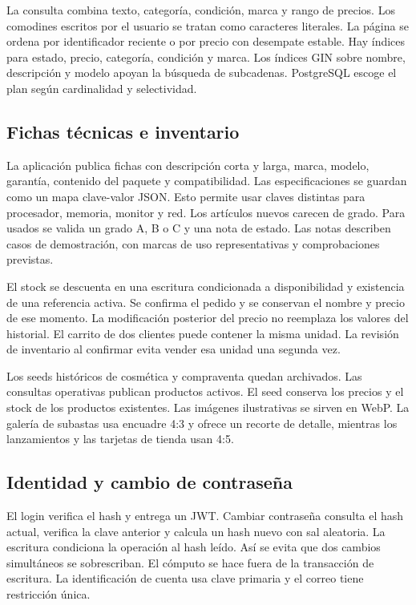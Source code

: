 \documentclass[conference]{IEEEtran}
\begin{document}
La consulta combina texto, categoría, condición, marca y rango de precios. Los comodines escritos por el usuario se tratan como caracteres literales. La página se ordena por identificador reciente o por precio con desempate estable. Hay índices para estado, precio, categoría, condición y marca. Los índices GIN sobre nombre, descripción y modelo apoyan la búsqueda de subcadenas. PostgreSQL escoge el plan según cardinalidad y selectividad.

\subsection{Fichas técnicas e inventario}
La aplicación publica fichas con descripción corta y larga, marca, modelo, garantía, contenido del paquete y compatibilidad. Las especificaciones se guardan como un mapa clave-valor JSON. Esto permite usar claves distintas para procesador, memoria, monitor y red. Los artículos nuevos carecen de grado. Para usados se valida un grado A, B o C y una nota de estado. Las notas describen casos de demostración, con marcas de uso representativas y comprobaciones previstas.

El stock se descuenta en una escritura condicionada a disponibilidad y existencia de una referencia activa. Se confirma el pedido y se conservan el nombre y precio de ese momento. La modificación posterior del precio no reemplaza los valores del historial. El carrito de dos clientes puede contener la misma unidad. La revisión de inventario al confirmar evita vender esa unidad una segunda vez.

Los seeds históricos de cosmética y compraventa quedan archivados. Las consultas operativas publican productos activos. El seed conserva los precios y el stock de los productos existentes. Las imágenes ilustrativas se sirven en WebP. La galería de subastas usa encuadre 4:3 y ofrece un recorte de detalle, mientras los lanzamientos y las tarjetas de tienda usan 4:5.

\subsection{Identidad y cambio de contraseña}
El login verifica el hash y entrega un JWT. Cambiar contraseña consulta el hash actual, verifica la clave anterior y calcula un hash nuevo con sal aleatoria. La escritura condiciona la operación al hash leído. Así se evita que dos cambios simultáneos se sobrescriban. El cómputo se hace fuera de la transacción de escritura. La identificación de cuenta usa clave primaria y el correo tiene restricción única.
\end{document}

